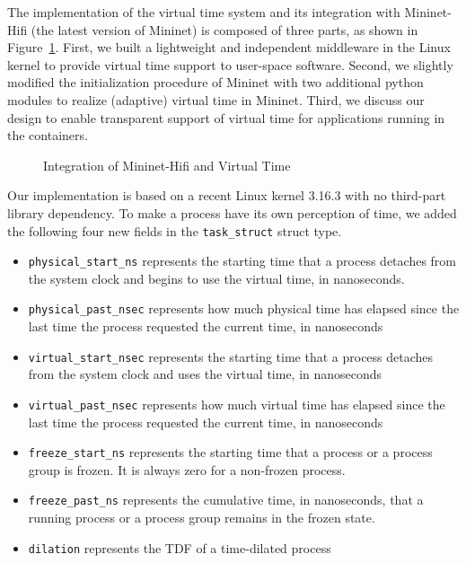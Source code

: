 \label{VT:Sec:Implementation}

The implementation of the virtual time system and its integration with Mininet-Hifi (the latest version of Mininet) is composed of three parts,
as shown in Figure~\ref{VT:Fig:VTMininetHifi}.
First, we built a lightweight and independent middleware in the Linux kernel to provide virtual time support to user-space software.
Second, we slightly modified the initialization procedure of Mininet with two additional python modules to realize (adaptive) virtual time in Mininet.
Third, we discuss our design to enable transparent support of virtual time for applications running in the containers.

\begin{figure}
    \centering
    \caption{Integration of Mininet-Hifi and Virtual Time}
    \label{VT:Fig:VTMininetHifi}
\end{figure}


\label{VT:SubSec:ExtendLinuxKernel}
Our implementation is based on a recent Linux kernel 3.16.3 with no third-part library dependency.
To make a process have its own perception of time, we added the following four new fields in the \texttt{task\_struct} struct type.
\begin{itemize}
    \item \texttt{physical\_start\_ns} represents the starting time that a process detaches from the system clock and begins to use the virtual time, in nanoseconds.
    \item \texttt{physical\_past\_nsec} represents how much physical time has elapsed since the last time the process requested the current time, in nanoseconds
    \item \texttt{virtual\_start\_nsec} represents the starting time that a process detaches from the system clock and uses the virtual time, in nanoseconds 
    \item \texttt{virtual\_past\_nsec} represents how much virtual time has elapsed since the last time the process requested the current time, in nanoseconds
    \item \texttt{freeze\_start\_ns} represents the starting time that a process or a process group is frozen. It is always zero for a non-frozen process.
    \item \texttt{freeze\_past\_ns} represents the cumulative time, in nanoseconds, that a running process or a process group remains in the frozen state.
    \item \texttt{dilation} represents the TDF of a time-dilated process
\end{itemize}

